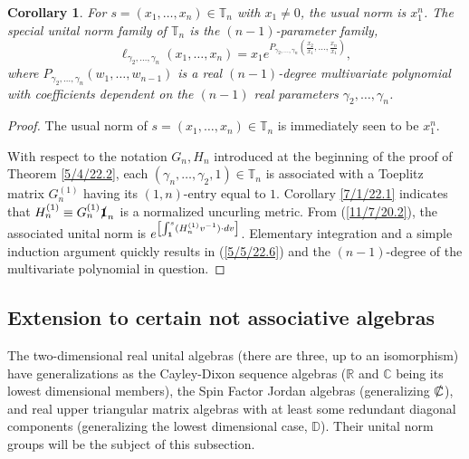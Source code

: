 \documentclass{amsart}
\numberwithin{equation}{section}
\newtheorem{corollary}[theorem]{Corollary}
\theoremstyle{definition}
\numberwithin{theorem}{section}
\begin{document}
\begin{corollary}\label{5/17/22.1} For $s= (x_1,\dots,x_n)\in \mathbb{T}_n$ with $x_1\ne 0$, the usual norm is $x_1^n$.  The special unital norm family of $\mathbb{T}_n$ is the $(n-1)$-parameter family,
\begin{equation} \label{5/5/22.6} \ell_{\gamma_2,\dots,\gamma_n}(x_1,\dots,x_n) = x_1 e^{P_{\gamma_2,\dots,\gamma_n}\left(\frac{x_2}{x_1},\dots,\frac{x_n}{x_1}\right)},\end{equation} where $P_{\gamma_2,\dots,\gamma_n}(w_1,\dots,w_{n-1})$ is a real $(n-1)$-degree multivariate polynomial with coefficients dependent on the $(n-1)$ real parameters $\gamma_2,\dots,\gamma_n$.    \end{corollary}

\begin{proof} The usual norm of $s=(x_1,\dots,x_n)\in \mathbb{T}_n$ is immediately seen to be $x_1^n$.

With respect to the notation $G_n,H_n$ introduced at the beginning of the proof of Theorem \ref{5/4/22.2}, each $(\gamma_n,\dots,\gamma_2,1)\in\mathbb{T}_n$ is associated with a Toeplitz matrix $G_n^{(1)}$ having its $(1,n)$-entry equal to $1$.  Corollary \ref{7/1/22.1} indicates that $H^{(1)}_n\equiv G_n^{(1)}\slashed{\bf 1}_n$ is a normalized uncurling metric. From (\ref{11/7/20.2}),  the associated unital norm is $e^{\left[\int_{\bf 1}^s (H_n^{(1)} v^{-1})\cdot dv\right]}$.  Elementary integration and a simple induction argument quickly results in (\ref{5/5/22.6}) and the $(n-1)$-degree of the multivariate polynomial in question.
\end{proof}
 
\subsection{Extension to certain not associative algebras}
The two-dimensional real unital algebras (there are three, up to an isomorphism) have generalizations as the Cayley-Dixon sequence algebras ($\mathbb{R}$ and $\mathbb{C}$ being its lowest dimensional members),  the Spin Factor Jordan algebras (generalizing $\slashed{\mathbb{C}}$), and real upper triangular matrix algebras with at least some redundant diagonal components (generalizing the lowest dimensional case, $\mathbb{D}$).  Their unital norm groups will be the subject of this subsection. 
\end{document}
